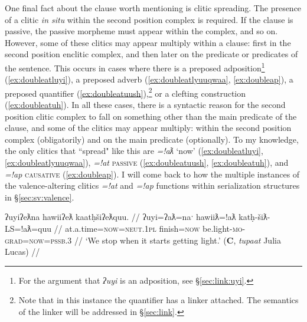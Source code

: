One final fact about the clause worth mentioning is clitic spreading. The presence of a clitic \textit{in situ} within the second position complex is required. If the clause is passive, the passive morpheme must appear within the complex, and so on. However, some of these clitics may appear multiply within a clause: first in the second position enclitic complex, and then later on the predicate or predicates of the sentence. This occurs in cases where there is a preposed adposition\footnote{For the argument that \textit{ʔuyi} is an adposition, see \S\ref{sec:link:uyi}.} (\ref{ex:doubleatluyi}), a preposed adverb (\ref{ex:doubleatlyuuqwaa}, \ref{ex:doubleap}), a preposed quantifier (\ref{ex:doubleatuush}),\footnote{Note that in this instance the quantifier has a linker attached. The semantics of the linker will be addressed in \S\ref{sec:link}.} or a clefting construction (\ref{ex:doubleatuh}). In all these cases, there is a syntactic reason for the second position clitic complex to fall on something other than the main predicate of the clause, and some of the clitics may appear multiply: within the second position complex (obligatorily) and on the main predicate (optionally). To my knowledge, the only clitics that ``spread" like this are \textit{=!aƛ} `now' (\ref{ex:doubleatluyi}, \ref{ex:doubleatlyuuqwaa}), \textit{=!at} \textsc{passive} (\ref{ex:doubleatuush}, \ref{ex:doubleatuh}), and \textit{=!ap} \textsc{causative} (\ref{ex:doubleap}). I will come back to how the multiple instances of the valence-altering clitics \textit{=!at} and \textit{=!ap} functions within serialization structures in \S\ref{sec:sv:valence}. %

\ex \label{ex:doubleatluyi}
\begingl
\glpreamble ʔuyiʔeƛna hawiiʔeƛ kaatḥšiʔeƛquu. //
\gla ʔuyi=ʔaƛ=naˑ hawiiƛ=!aƛ katḥ-šiƛ-LS=!aƛ=quu  //
\glb at.a.time=\textsc{now}=\textsc{neut.1pl} finish=\textsc{now} be.light-\textsc{mo}-\textsc{grad}=\textsc{now}=\textsc{pssb.3} //
\glft `We stop when it starts getting light.' (\textbf{C}, \textit{tupaat} Julia Lucas) //
\endgl
\xe


